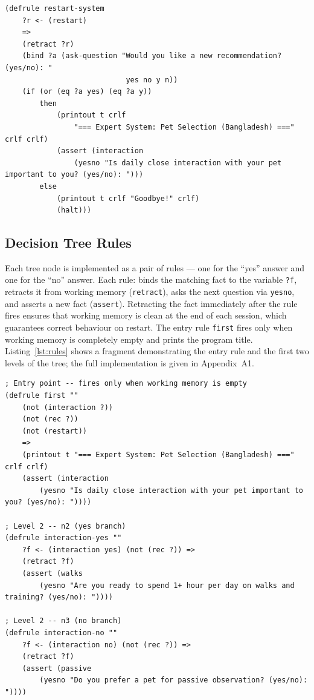 \documentclass[a4paper,final]{article}
\begin{document}
\begin{lstlisting}[language=CLIPS,
	caption={The restart-system rule},
	label=lst:restart]
(defrule restart-system
    ?r <- (restart)
    =>
    (retract ?r)
    (bind ?a (ask-question "Would you like a new recommendation? (yes/no): "
                            yes no y n))
    (if (or (eq ?a yes) (eq ?a y))
        then
            (printout t crlf
                "=== Expert System: Pet Selection (Bangladesh) ===" crlf crlf)
            (assert (interaction
                (yesno "Is daily close interaction with your pet important to you? (yes/no): ")))
        else
            (printout t crlf "Goodbye!" crlf)
            (halt)))
\end{lstlisting}

\subsection{Decision Tree Rules}

Each tree node is implemented as a pair of rules --- one for the ``yes'' answer and one for the ``no'' answer. Each rule: binds the matching fact to the variable \texttt{?f}, retracts it from working memory (\texttt{retract}), asks the next question via \texttt{yesno}, and asserts a new fact (\texttt{assert}). Retracting the fact immediately after the rule fires ensures that working memory is clean at the end of each session, which guarantees correct behaviour on restart. The entry rule \texttt{first} fires only when working memory is completely empty and prints the program title. Listing~\ref{lst:rules} shows a fragment demonstrating the entry rule and the first two levels of the tree; the full implementation is given in Appendix~A1.

\begin{lstlisting}[language=CLIPS,
	caption={Fragment of decision tree rules (entry rule and first two levels)},
	label=lst:rules]
; Entry point -- fires only when working memory is empty
(defrule first ""
    (not (interaction ?))
    (not (rec ?))
    (not (restart))
    =>
    (printout t "=== Expert System: Pet Selection (Bangladesh) ===" crlf crlf)
    (assert (interaction
        (yesno "Is daily close interaction with your pet important to you? (yes/no): "))))

; Level 2 -- n2 (yes branch)
(defrule interaction-yes ""
    ?f <- (interaction yes) (not (rec ?)) =>
    (retract ?f)
    (assert (walks
        (yesno "Are you ready to spend 1+ hour per day on walks and training? (yes/no): "))))

; Level 2 -- n3 (no branch)
(defrule interaction-no ""
    ?f <- (interaction no) (not (rec ?)) =>
    (retract ?f)
    (assert (passive
        (yesno "Do you prefer a pet for passive observation? (yes/no): "))))
\end{lstlisting}
\end{document}
